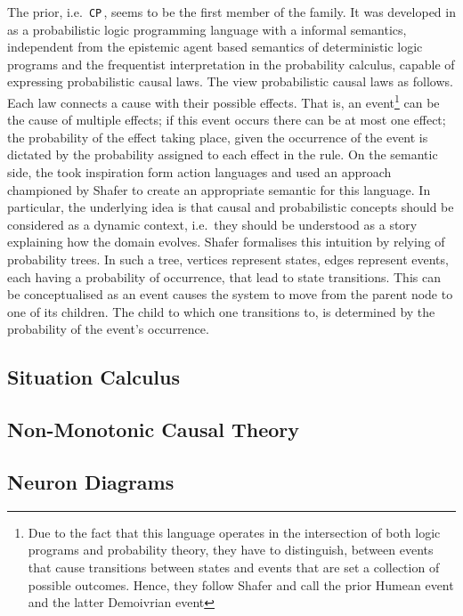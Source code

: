 \documentclass[11pt,a4paper]{book}
\theoremstyle{definition}
\theoremstyle{definition}
\theoremstyle{definition}
\theoremstyle{remark}
\newcommand{\cp}{\texttt{CP}\,}
\begin{document}
The prior, i.e.\ \cp, seems to be the first member of the family. It was developed in \parencite{vennekens2009cp} as a probabilistic logic programming language with a informal semantics, independent from the epistemic agent based semantics of deterministic logic programs and the frequentist interpretation in the probability calculus, capable of expressing probabilistic causal laws. 
The view probabilistic causal laws as follows. Each law connects a cause with their possible effects. That is, an event\footnote{Due to the fact that this language operates in the intersection of both logic programs and probability theory, they have to distinguish, between events that cause transitions between states and events that are set a collection of possible outcomes. Hence, they follow Shafer and call the prior Humean event and the latter Demoivrian event} can be the cause of multiple effects; if this event occurs there can be at most one effect; the probability of the effect taking place, given the occurrence of the event is dictated by the probability assigned to each effect in the rule.
On the semantic side, the took inspiration form action languages and used an approach championed by Shafer to create an appropriate semantic for this language.
In particular, the underlying idea is that causal and probabilistic concepts should be considered as a dynamic context, i.e.\ they should be understood as a story explaining how the domain evolves. 
Shafer formalises this intuition by relying of probability trees. In such a tree, vertices represent states, edges represent events, each having a probability of occurrence, that lead to state transitions. This can be conceptualised as an event causes the system to move from the parent node to one of its children. The child to which one transitions to, is determined by the probability of the event's occurrence.

\subsection{Situation Calculus}

\subsection{Non-Monotonic Causal Theory}


\subsection{Neuron Diagrams}
\end{document}
